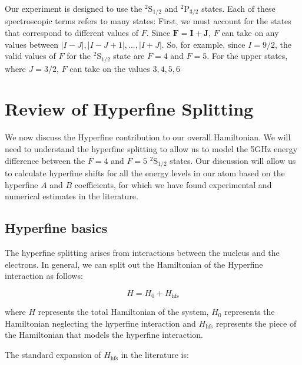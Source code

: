
Our experiment is designed to use the $^2$S$_{1/2}$ and $^2$P$_{3/2}$ states. Each of these spectroscopic terms refers to many states: First, we must account for the states that correspond to different values of $F$. Since $\mathbf{F}=\mathbf{I}+\mathbf{J}$, $F$ can take on any values between $|I-J|,|I-J+1|,...,|I+J|$. So, for example, since $I=9/2$, the valid values of $F$ for the $^2$S$_{1/2}$ state are $F=4$ and $F=5$. For the upper states, where $J=3/2$, $F$ can take on the values $3,4,5,6$ 

\section{Review of Hyperfine Splitting}

We now discuss the Hyperfine contribution to our overall Hamiltonian. We will need to understand the hyperfine splitting to allow us to model the 5GHz energy difference between the $F=4$ and $F=5$ $^2$S$_{1/2}$ states. Our discussion will allow us to calculate hyperfine shifts for all the energy levels in our atom based on the hyperfine $A$ and $B$ coefficients, for which we have found experimental and numerical estimates in the literature.

\subsection{Hyperfine basics}

The hyperfine splitting arises from interactions between the nucleus and the electrons. In general, we can split out the Hamiltonian of the Hyperfine interaction as follows: 

\begin{equation}
H=H_0+H_{\mathrm{hfs}}
\end{equation}

where $H$ represents the total Hamiltonian of the system, $H_0$ represents the Hamiltonian neglecting the hyperfine interaction and $H_{\mathrm{hfs}}$ represents the piece of the Hamiltonian that models the hyperfine interaction. 

The standard expansion of $H_{\mathrm{hfs}}$ in the literature is:  

